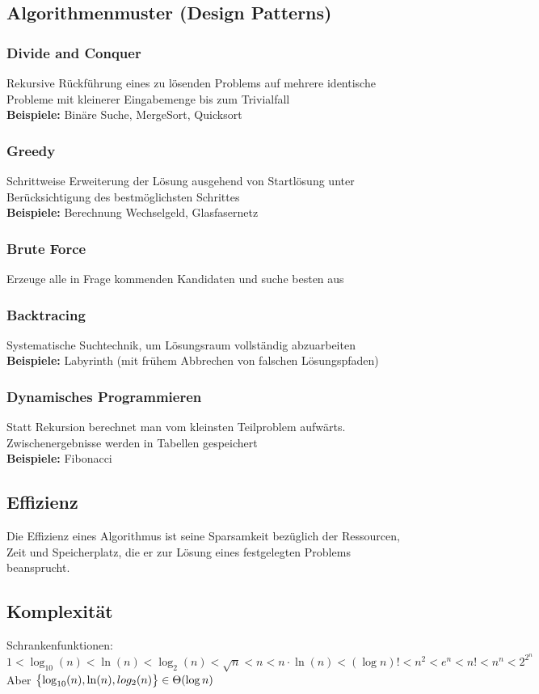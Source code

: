 \documentclass[fs, footer]{latex4ei}
\begin{document}
\begin{multicols*}{4}
\subsection{Algorithmenmuster (Design Patterns)}
\subsubsection{Divide and Conquer}
Rekursive Rückführung eines zu lösenden Problems auf mehrere identische Probleme mit kleinerer Eingabemenge bis zum Trivialfall\\
\textbf{Beispiele:} Binäre Suche, MergeSort, Quicksort
\subsubsection{Greedy}
Schrittweise Erweiterung der Lösung ausgehend von Startlösung unter Berücksichtigung des bestmöglichsten Schrittes\\
\textbf{Beispiele:} Berechnung Wechselgeld, Glasfasernetz
\subsubsection{Brute Force}
Erzeuge alle in Frage kommenden Kandidaten und suche besten aus
\subsubsection{Backtracing}
Systematische Suchtechnik, um Lösungsraum vollständig abzuarbeiten\\
\textbf{Beispiele:} Labyrinth (mit frühem Abbrechen von falschen Lösungspfaden)
\subsubsection{Dynamisches Programmieren}
Statt Rekursion berechnet man vom kleinsten Teilproblem \dq aufwärts\dq. Zwischenergebnisse werden in Tabellen gespeichert\\
\textbf{Beispiele:} Fibonacci
\subsection{Effizienz}
Die Effizienz eines Algorithmus ist seine Sparsamkeit bezüglich der Ressourcen, Zeit und Speicherplatz, die er zur Lösung eines festgelegten Problems beansprucht.

\subsection{Komplexität}
Schrankenfunktionen:
$1<\log_{10}(n)<\ln(n)<\log_2(n)<\sqrt{n}<n<n\cdot \ln(n)<(\log n)! <n^2 < e^n < n! < n^n < 2^{2^n}$\\
Aber $\bigl\{\log_{10}(n), \ln (n), log_2 (n)\bigr\} \in \Theta(\log n)$


\end{multicols*}
\end{document}
